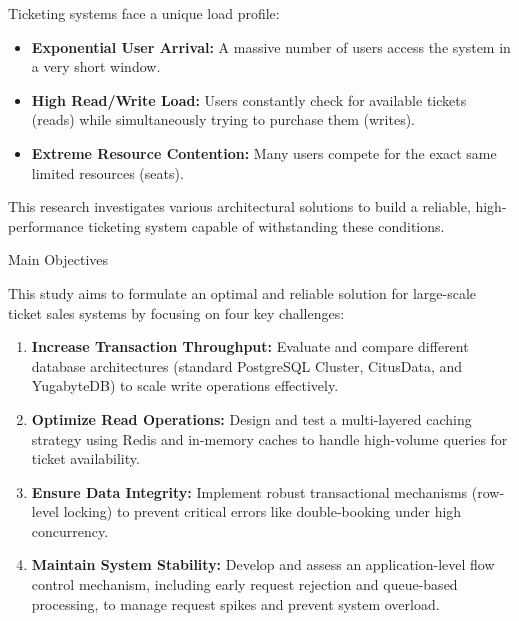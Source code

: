 \documentclass[a0,landscape]{config/poster/a0poster}
\newcommand{\postersection}[1]{%
  \begin{tcolorbox}[
    colback=IEEEblue,
    colframe=IEEEblue,
    fonttitle=\bfseries,
    coltext=white,
    sharp corners,
    boxrule=0pt,
    top=4pt,
    bottom=4pt,
    halign=center
  ]
    \large #1
  \end{tcolorbox}%
}
\begin{document}
\begin{multicols}{4}
    Ticketing systems face a unique load profile:
    \begin{itemize}
        \item \textbf{Exponential User Arrival:} A massive number of users access the system in a very short window.
        \item \textbf{High Read/Write Load:} Users constantly check for available tickets (reads) while simultaneously trying to purchase them (writes).
        \item \textbf{Extreme Resource Contention:} Many users compete for the exact same limited resources (seats).
    \end{itemize}
    This research investigates various architectural solutions to build a reliable, high-performance ticketing system capable of withstanding these conditions.


    \postersection{Main Objectives}
    This study aims to formulate an optimal and reliable solution for large-scale ticket sales systems by focusing on four key challenges:
    \begin{enumerate}
        \item \textbf{Increase Transaction Throughput:} Evaluate and compare different database architectures (standard PostgreSQL Cluster, CitusData, and YugabyteDB) to scale write operations effectively.
        \item \textbf{Optimize Read Operations:} Design and test a multi-layered caching strategy using Redis and in-memory caches to handle high-volume queries for ticket availability.
        \item \textbf{Ensure Data Integrity:} Implement robust transactional mechanisms (row-level locking) to prevent critical errors like double-booking under high concurrency.
        \item \textbf{Maintain System Stability:} Develop and assess an application-level flow control mechanism, including early request rejection and queue-based processing, to manage request spikes and prevent system overload.
    \end{enumerate}



\end{multicols}
\end{document}
